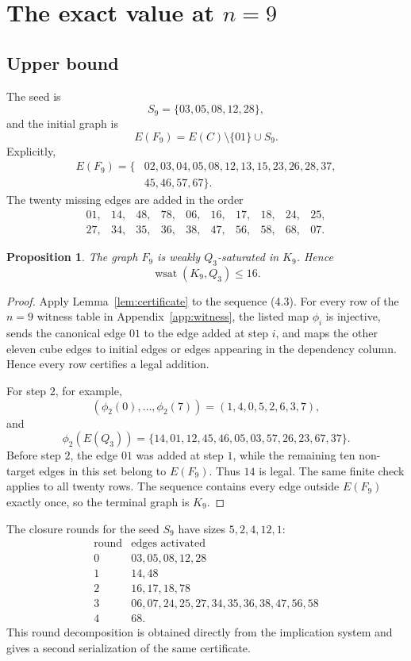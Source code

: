 \documentclass[11pt]{article}
\numberwithin{equation}{section}
\newtheorem{proposition}[theorem]{Proposition}
\newcommand{\wsat}{\operatorname{wsat}}
\begin{document}
\section{\texorpdfstring{The exact value at $n=9$}{The exact value at n=9}}\label{sec:n9}

\subsection{Upper bound}
The seed is
\[
S_9=\{03,05,08,12,28\},
\tag{4.1}
\]
and the initial graph is
\[
E(F_9)=E(C)\setminus\{01\}\cup S_9.
\tag{4.2}
\]
Explicitly,
\[
\begin{aligned}
E(F_9)=\{&02,03,04,05,08,12,13,15,23,26,28,37,\\
&45,46,57,67\}.
\end{aligned}
\]
The twenty missing edges are added in the order
\[
\begin{array}{llllllllll}
01,&14,&48,&78,&06,&16,&17,&18,&24,&25,\\
27,&34,&35,&36,&38,&47,&56,&58,&68,&07.
\end{array}
\tag{4.3}
\]

\begin{proposition}\label{prop:n9upper}
The graph $F_9$ is weakly $Q_3$-saturated in $K_9$. Hence
\[
\wsat(K_9,Q_3)\le16.
\]
\end{proposition}

\begin{proof}
Apply Lemma~\ref{lem:certificate} to the sequence (4.3). For every row of the $n=9$ witness table in Appendix~\ref{app:witness}, the listed map $\phi_i$ is injective, sends the canonical edge $01$ to the edge added at step $i$, and maps the other eleven cube edges to initial edges or edges appearing in the dependency column. Hence every row certifies a legal addition.

For step $2$, for example,
\[
(\phi_2(0),\ldots,\phi_2(7))=(1,4,0,5,2,6,3,7),
\]
and
\[
\phi_2(E(Q_3))=\{14,01,12,45,46,05,03,57,26,23,67,37\}.
\]
Before step $2$, the edge $01$ was added at step $1$, while the remaining ten non-target edges in this set belong to $E(F_9)$. Thus $14$ is legal. The same finite check applies to all twenty rows. The sequence contains every edge outside $E(F_9)$ exactly once, so the terminal graph is $K_9$.
\end{proof}

The closure rounds for the seed $S_9$ have sizes $5,2,4,12,1$:
\[
\begin{array}{c|l}
\text{round}&\text{edges activated}\\ \hline
0&03,05,08,12,28\\
1&14,48\\
2&16,17,18,78\\
3&06,07,24,25,27,34,35,36,38,47,56,58\\
4&68.
\end{array}
\tag{4.4}
\]
This round decomposition is obtained directly from the implication system and gives a second serialization of the same certificate.
\end{document}
